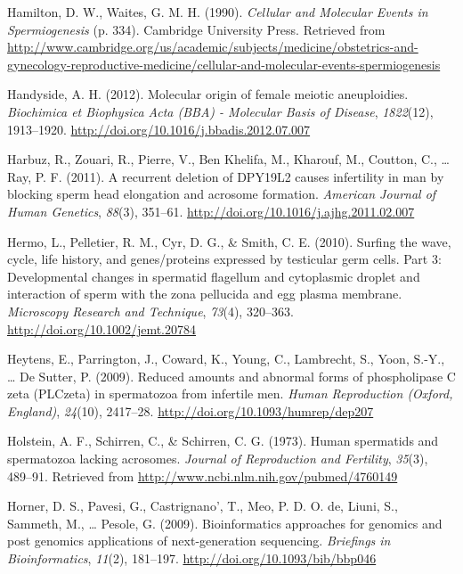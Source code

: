\documentclass[12pt,twoside]{reedthesis}
\theoremstyle{definition}
\theoremstyle{definition}
\theoremstyle{remark}
\begin{document}
  \hypertarget{ref-Hamilton1987}{}
  Hamilton, D. W., Waites, G. M. H. (1990). \emph{Cellular and Molecular
  Events in Spermiogenesis} (p. 334). Cambridge University Press.
  Retrieved from
  \url{http://www.cambridge.org/us/academic/subjects/medicine/obstetrics-and-gynecology-reproductive-medicine/cellular-and-molecular-events-spermiogenesis}
  
  \hypertarget{ref-Handyside2012}{}
  Handyside, A. H. (2012). Molecular origin of female meiotic
  aneuploidies. \emph{Biochimica et Biophysica Acta (BBA) - Molecular
  Basis of Disease}, \emph{1822}(12), 1913--1920.
  \url{http://doi.org/10.1016/j.bbadis.2012.07.007}
  
  \hypertarget{ref-Harbuz2011}{}
  Harbuz, R., Zouari, R., Pierre, V., Ben Khelifa, M., Kharouf, M.,
  Coutton, C., \ldots{} Ray, P. F. (2011). A recurrent deletion of DPY19L2
  causes infertility in man by blocking sperm head elongation and acrosome
  formation. \emph{American Journal of Human Genetics}, \emph{88}(3),
  351--61. \url{http://doi.org/10.1016/j.ajhg.2011.02.007}
  
  \hypertarget{ref-Hermo2010}{}
  Hermo, L., Pelletier, R. M., Cyr, D. G., \& Smith, C. E. (2010). Surfing
  the wave, cycle, life history, and genes/proteins expressed by
  testicular germ cells. Part 3: Developmental changes in spermatid
  flagellum and cytoplasmic droplet and interaction of sperm with the zona
  pellucida and egg plasma membrane. \emph{Microscopy Research and
  Technique}, \emph{73}(4), 320--363.
  \url{http://doi.org/10.1002/jemt.20784}
  
  \hypertarget{ref-Heytens2009}{}
  Heytens, E., Parrington, J., Coward, K., Young, C., Lambrecht, S., Yoon,
  S.-Y., \ldots{} De Sutter, P. (2009). Reduced amounts and abnormal forms
  of phospholipase C zeta (PLCzeta) in spermatozoa from infertile men.
  \emph{Human Reproduction (Oxford, England)}, \emph{24}(10), 2417--28.
  \url{http://doi.org/10.1093/humrep/dep207}
  
  \hypertarget{ref-Holstein1973}{}
  Holstein, A. F., Schirren, C., \& Schirren, C. G. (1973). Human
  spermatids and spermatozoa lacking acrosomes. \emph{Journal of
  Reproduction and Fertility}, \emph{35}(3), 489--91. Retrieved from
  \url{http://www.ncbi.nlm.nih.gov/pubmed/4760149}
  
  \hypertarget{ref-Horner2009}{}
  Horner, D. S., Pavesi, G., Castrignano', T., Meo, P. D. O. de, Liuni,
  S., Sammeth, M., \ldots{} Pesole, G. (2009). Bioinformatics approaches
  for genomics and post genomics applications of next-generation
  sequencing. \emph{Briefings in Bioinformatics}, \emph{11}(2), 181--197.
  \url{http://doi.org/10.1093/bib/bbp046}
  
\end{document}
